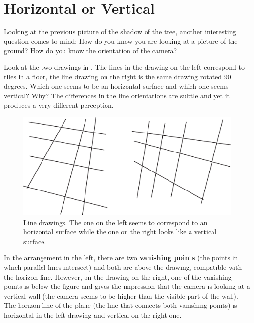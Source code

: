 \section{Horizontal or Vertical}

Looking at the previous picture of the shadow of the tree, another interesting question comes to mind: How do you know you are looking at a picture of the ground? How do you know the orientation of the camera?

Look at the two drawings in \fig{\ref{fig:vertical_or_horizontal}}. The lines in the drawing on the left correspond to tiles in a floor, the line drawing on the right is the same drawing rotated 90 degrees. Which one seems to be an horizontal surface and which one seems vertical? Why? The differences in the line orientations are subtle and yet it produces a very different perception.

\begin{figure}[t]
\centerline{
    \includegraphics[width=1\linewidth]{figures/visionscience/vertical_or_horizontal.eps}}
    \caption{Line drawings. The one on the left seems to correspond to an horizontal surface while the one on the right looks like a vertical surface.}
    \label{fig:vertical_or_horizontal}
\end{figure}

In the arrangement in the left, there are two {\bf vanishing points} (the points in which parallel lines intersect) and both are above the drawing, compatible with the horizon line. However, on the drawing on the right, one of the vanishing points is below the figure and gives the impression that the camera is looking at a vertical wall (the camera seems to be higher than the visible part of the wall). The horizon line of the plane (the line that connects both vanishing points) is horizontal in the left drawing and vertical on the right one.





